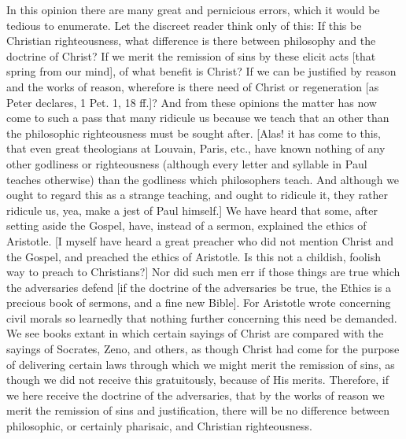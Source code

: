 In this opinion there are many great and pernicious errors, which it
would be tedious to enumerate.  Let the discreet reader think only of
this: If this be Christian righteousness, what difference is there
between philosophy and the doctrine of Christ?  If we merit the
remission of sins by these elicit acts [that spring from our mind],
of what benefit is Christ?  If we can be justified by reason and the
works of reason, wherefore is there need of Christ or regeneration
[as Peter declares, 1 Pet. 1, 18 ff.]?  And from these opinions the
matter has now come to such a pass that many ridicule us because we
teach that an other than the philosophic righteousness must be sought
after.  [Alas! it has come to this, that even great theologians at
Louvain, Paris, etc., have known nothing of any other godliness or
righteousness (although every letter and syllable in Paul teaches
otherwise) than the godliness which philosophers teach.  And although
we ought to regard this as a strange teaching, and ought to ridicule
it, they rather ridicule us, yea, make a jest of Paul himself.] We
have heard that some, after setting aside the Gospel, have, instead
of a sermon, explained the ethics of Aristotle.  [I myself have heard
a great preacher who did not mention Christ and the Gospel, and
preached the ethics of Aristotle.  Is this not a childish, foolish
way to preach to Christians?] Nor did such men err if those things
are true which the adversaries defend [if the doctrine of the
adversaries be true, the Ethics is a precious book of sermons, and a
fine new Bible].  For Aristotle wrote concerning civil morals so
learnedly that nothing further concerning this need be demanded.  We
see books extant in which certain sayings of Christ are compared with
the sayings of Socrates, Zeno, and others, as though Christ had come
for the purpose of delivering certain laws through which we might
merit the remission of sins, as though we did not receive this
gratuitously, because of His merits.  Therefore, if we here receive
the doctrine of the adversaries, that by the works of reason we merit
the remission of sins and justification, there will be no difference
between philosophic, or certainly pharisaic, and Christian
righteousness.

